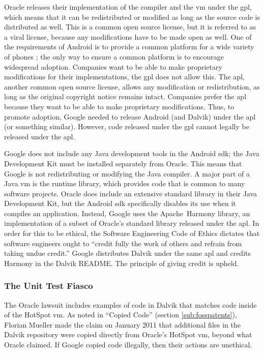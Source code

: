 \documentclass[11pt]{article}
\begin{document}
\begin{multicols}{2}
Oracle releases their implementation of the compiler and the \gls{vm} under the
\gls{gpl}, which means that it can be redistributed or modified as long as the
source code is distributed as well.  This is a common open source license, but
it is referred to as a viral license, because any modifications have to be made
open as well.  One of the requirements of Android is to provide a common
platform for a wide variety of phones \cite{open-handset-alliance-ann}; the only
way to ensure a common platform is to encourage widespread adoption.  Companies
want to be able to make proprietary modifications for their implementations, the
\gls{gpl} does not allow this.  The \gls{apl}, another common open source
license, allows any modification or redistribution, as long as the original
copyright notice remains intact.  Companies prefer the \gls{apl} because they
want to be able to make proprietary modifications.  \cite{why-apache2-license}
Thus, to promote adoption, Google needed to release Android (and Dalvik) under
the \gls{apl} (or something similar).  However, code released under the
\gls{gpl} cannot legally be released under the \gls{apl}.

Google does not include any Java development tools in the Android \gls{sdk}; the
Java Development Kit must be installed separately from Oracle.  This means that
Google is not redistributing or modifying the Java compiler.  A major part of a
Java \gls{vm} is the runtime \gls{library}, which provides code that is common
to many software projects.  Oracle does include an extensive standard
\gls{library} in their Java Development Kit, but the Android \gls{sdk}
specifically disables its use when it compiles an application.  Instead, Google
uses the Apache~Harmony \gls{library}, an implementation of a subset of Oracle's
standard \gls{library} released under the \gls{apl}.  In order for this to be
ethical, the Software Engineering Code of Ethics dictates that software
engineers ought to ``credit fully the work of others and refrain from taking
undue credit.'' \cite[\S 7.03]{secode}  Google distributes Dalvik under the same
\gls{apl} and credits Harmony in the Dalvik README.  \cite{dalvik-readme}  The
principle of giving credit is upheld.

\subsubsection{The Unit Test Fiasco} %
\label{ssub:unittest-fiasco}

The Oracle lawsuit includes examples of code in Dalvik that matches code inside
of the HotSpot \gls{vm}.  As noted in ``Copied Code'' (section
\ref{sub:fosspatents}), Florian Mueller made the claim on January 2011 that
additional files in the Dalvik repository were copied directly from Oracle's
HotSpot \gls{vm}, beyond what Oracle claimed.  If Google copied code illegally,
then their actions are unethical.


\end{multicols}
\end{document}
